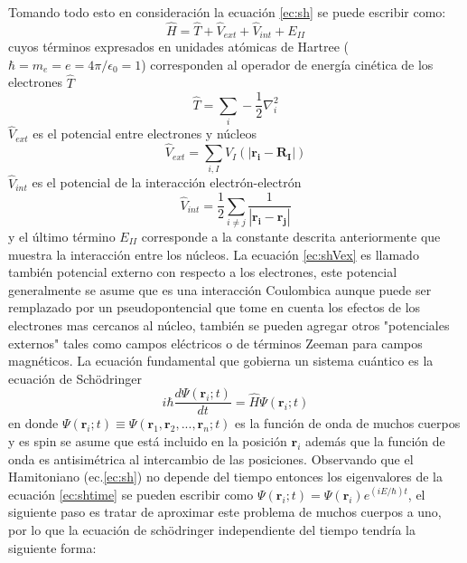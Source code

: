 \documentclass[12pt,a4paper, oneside]{book}
\begin{document}
	\newline
	Tomando todo esto en consideraci\'on la ecuaci\'on \ref{ec:sh} se puede escribir como:
	 \begin{equation}
	 \hat H = \hat T + \hat V_{ext} + \hat V_{int}+E_{II} \label{ec:shelectron}
	 \end{equation}
	cuyos t\'erminos expresados en unidades at\'omicas de Hartree ($\hbar = m_{e} = e= 4\pi / \epsilon_0 =1 $)  corresponden al operador de energ\'ia cin\'etica de los electrones $\hat T$
	\begin{equation}
	\hat{T} = \sum_{i} -\frac{1}{2} \nabla_{i}^2 \label{ec:shT}
	\end{equation}
	$\hat{V}_{ext}$ es el potencial entre electrones y n\'ucleos
	\begin{equation}
	\hat{V}_{ext} = \sum_{i,I} V_I (|\pmb{r_i}-\pmb{R_I}|) \label{ec:shVex}
	\end{equation}
	$\hat{V}_{int}$ es el potencial de la interacci\'on electr\'on-electr\'on
	\begin{equation}
	\hat{V}_{int} = \frac{1}{2} \sum_{i \not= j} \frac{1}{|\pmb{r_i}-\pmb{r_j}|} \label{ec:shVint}
	\end{equation}
	y el \'ultimo  t\'ermino $E_{II}$ corresponde a la constante descrita anteriormente que muestra la interacci\'on entre los n\'ucleos. La ecuaci\'on \ref{ec:shVex} es llamado tambi\'en potencial externo con respecto a los electrones, este potencial generalmente se asume que es una interacci\'on Coulombica aunque puede ser remplazado por un pseudopontencial que tome en cuenta los efectos de los electrones mas cercanos al n\'ucleo, tambi\'en se  pueden agregar otros "potenciales externos" tales como campos el\'ectricos o de t\'erminos Zeeman para campos magn\'eticos. 
	\newline
	\newline
	La ecuaci\'on fundamental que gobierna un sistema cu\'antico es la ecuaci\'on de Sch\"odringer
	\begin{equation}
	i \hbar \frac{d \Psi ({\pmb{r}_i}; t)}{dt} = \hat H \Psi ({\pmb{r}_i}; t) \label{ec:shtime}
	\end{equation}
	en donde $\Psi ({\pmb{r}_i}; t) \equiv \Psi ({\pmb{r}_1, \pmb{r}_2, ... ,\pmb{r}_n }; t) $ es la funci\'on de onda de muchos cuerpos y es spin se asume que est\'a incluido en la posici\'on $\pmb{r}_i$ adem\'as que la funci\'on de onda es antisim\'etrica al intercambio de las posiciones. Observando que el Hamitoniano (ec.\ref{ec:sh}) no depende del tiempo entonces los eigenvalores de la ecuaci\'on \ref{ec:shtime} se pueden escribir como $ \Psi ({\pmb{r}_i}; t) =  \Psi ({\pmb{r}_i}) e^{(i E/ \hbar) t} $, el siguiente paso es tratar de aproximar este problema de muchos cuerpos a uno, por lo que la  ecuaci\'on de sch\"odringer independiente del tiempo tendr\'ia la siguiente forma:
\end{document}
